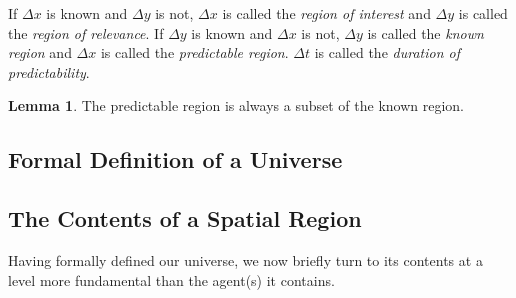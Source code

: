 \documentclass[12pt]{article}
\theoremstyle{definition}
\newtheorem{lem}{Lemma}
\begin{document}
If \(\Delta x\) is known and \(\Delta y\) is not, \(\Delta x\) is called the
\textit{region of interest} and \(\Delta y\) is called the \textit{region of
relevance}. If \(\Delta y\) is known and \(\Delta x\) is not, \(\Delta y\) is
called the \textit{known region} and \(\Delta x\) is called the
\textit{predictable region}. \(\Delta t\) is called the \textit{duration of
predictability}.

\begin{lem}
   The predictable region is always a subset of the known region.
\end{lem}





\subsection{Formal Definition of a Universe}
\label{sec:universe_formal}


\subsection{The Contents of a Spatial Region}
\label{sec:contents}

Having formally defined our universe, we now briefly turn to its contents at a
level more fundamental than the agent(s) it contains.
\end{document}
